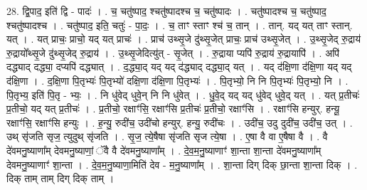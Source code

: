 \documentclass[17pt]{extarticle}
\begin{document}
28. द्वि॒पाद॒ इति॑ द्वि - पादः॑ । . च॒ चतु॑ष्पाद॒ श्चतु॑ष्पादश्च च॒ चतु॑ष्पादः । . चतु॑ष्पादश्च च॒ चतु॑ष्पाद॒ श्चतु॑ष्पादश्च । . चतु॑ष्पाद॒ इति॒ चतुः॑ - पा॒दः॒ । . च॒ ताꣳ स्ताꣳ श्च॑ च॒ तान् । . तान्. यद् यत् ताꣳ स्तान्. यत् । . यत् प्राचः॒ प्राचो॒ यद् यत् प्राचः॑ । . प्राच॑ उथ्सृ॒जे दु॑थ्सृ॒जेत् प्राचः॒ प्राच॑ उथ्सृ॒जेत् । . उ॒थ्सृ॒जेद् रु॒द्राय॑ रु॒द्रायो᳚थ्सृ॒जे दु॑थ्सृ॒जेद् रु॒द्राय॑ । . उ॒थ्सृ॒जेदित्यु॑त् - सृ॒जेत् । . रु॒द्राया प्यपि॑ रु॒द्राय॑ रु॒द्रायापि॑ । . अपि॑ दद्ध्याद् दद्ध्या॒ दप्यपि॑ दद्ध्यात् । . द॒द्ध्या॒द् यद् यद् द॑द्ध्याद् दद्ध्या॒द् यत् । . यद् द॑क्षि॒णा द॑क्षि॒णा यद् यद् द॑क्षि॒णा । . द॒क्षि॒णा पि॒तृभ्यः॑ पि॒तृभ्यो॑ दक्षि॒णा द॑क्षि॒णा पि॒तृभ्यः॑ । . पि॒तृभ्यो॒ नि नि पि॒तृभ्यः॑ पि॒तृभ्यो॒ नि । . पि॒तृभ्य॒ इति॑ पि॒तृ - भ्यः॒ । . नि धु॑वेद् धुवे॒न् नि नि धु॑वेत् । . धु॒वे॒द् यद् यद् धु॑वेद् धुवे॒द् यत् । . यत् प्र॒तीचः॑ प्र॒तीचो॒ यद् यत् प्र॒तीचः॑ । . प्र॒तीचो॒ रक्षाꣳ॑सि॒ रक्षाꣳ॑सि प्र॒तीचः॑ प्र॒तीचो॒ रक्षाꣳ॑सि । . रक्षाꣳ॑सि हन्युर्. हन्यू॒ रक्षाꣳ॑सि॒ रक्षाꣳ॑सि हन्युः । . ह॒न्यु॒ रुदी॑च॒ उदी॑चो हन्युर्. हन्यु॒ रुदी॑चः । . उदी॑च॒ उदु दुदी॑च॒ उदी॑च॒ उत् । . उथ् सृ॑जति सृज॒ त्युदुथ् सृ॑जति । . सृ॒ज॒ त्ये॒षैषा सृ॑जति सृज त्ये॒षा । . ए॒षा वै वा ए॒षैषा वै । . वै दे॑वमनु॒ष्याणा᳚म् देवमनु॒ष्याणां॒ ॅवै वै दे॑वमनु॒ष्याणा᳚म् । . दे॒व॒म॒नु॒ष्याणाꣳ॑ शा॒न्ता शा॒न्ता दे॑वमनु॒ष्याणा᳚म् देवमनु॒ष्याणाꣳ॑ शा॒न्ता । . दे॒व॒म॒नु॒ष्याणा॒मिति॑ देव - म॒नु॒ष्याणा᳚म् । . शा॒न्ता दिग् दिक् छा॒न्ता शा॒न्ता दिक् । . दिक् ताम् ताम् दिग् दिक् ताम् । \newline
\end{document}
